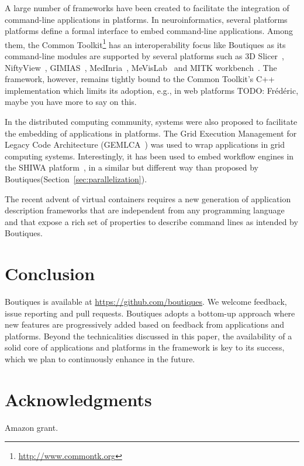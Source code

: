 \documentclass{article}
\newcommand{\todo}[1]{\color{red}TODO: #1\color{black}}
\newcommand{\boutiques}{Boutiques\xspace}
\begin{document}
A large number of frameworks have been created to facilitate the
integration of command-line applications in platforms. In
neuroinformatics, several platforms platforms define a formal
interface to embed command-line applications. Among them, the Common
Toolkit\footnote{\url{http://www.commontk.org}} has an
interoperability focus like \boutiques as its command-line modules are
supported by several platforms such as 3D Slicer~\cite{pieper20043d},
NiftyView~\cite{Craddock2016}, GIMIAS~\cite{larrabide2009gimias},
MedInria~\cite{larrabide2009gimias}, MeVisLab~\cite{heckel2009object}
and MITK workbench~\cite{nolden2013medical}. The framework, however,
remains tightly bound to the Common Toolkit's C++ implementation which
limits its adoption, e.g., in web platforms \todo{Fr\'ed\'eric, maybe
  you have more to say on this}.

In the distributed computing community, systems were also proposed to
facilitate the embedding of applications in platforms. The Grid
Execution Management for Legacy Code Architecture
(GEMLCA~\cite{delaitre2005gemlca}) was used to wrap applications in
grid computing systems. Interestingly, it has been used to embed
workflow engines in the SHIWA
platform~\cite{terstyanszky2014enabling}, in a similar but different
way than proposed by \boutiques (Section~\ref{sec:parallelization}).

The recent advent of virtual containers requires a new generation of
application description frameworks that are independent from any
programming language and that expose a rich set of properties to
describe command lines as intended by \boutiques.

\section{Conclusion}

\boutiques is available at \url{https://github.com/boutiques}. We
welcome feedback, issue reporting and pull requests. \boutiques adopts
a bottom-up approach where new features are progressively added based
on feedback from applications and platforms. Beyond the technicalities
discussed in this paper, the availability of a solid core of
applications and platforms in the framework is key to its success,
which we plan to continuously enhance in the future.

\section{Acknowledgments}

Amazon grant.



\end{document}
